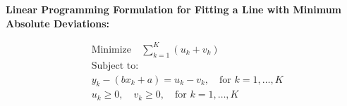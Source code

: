 \documentclass{article}
\begin{document}
\textbf{Linear Programming Formulation for Fitting a Line with Minimum Absolute Deviations:}

\begin{align*}
    & \text{Minimize} \quad \sum_{k=1}^{K} (u_k + v_k) \\
    & \text{Subject to:} \\
    & y_k - (bx_k + a) = u_k - v_k, \quad \text{for } k = 1, \ldots, K \\
    & u_k \geq 0, \quad v_k \geq 0, \quad \text{for } k = 1, \ldots, K
\end{align*}
\end{document}
